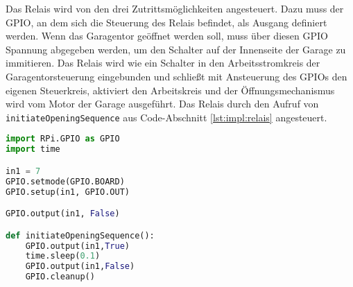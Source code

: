 Das Relais wird von den drei Zutrittsmöglichkeiten angesteuert. Dazu muss der GPIO, an dem sich die Steuerung des Relais befindet, als Ausgang definiert werden. Wenn das Garagentor geöffnet werden soll, muss über diesen GPIO Spannung abgegeben werden, um den Schalter auf der Innenseite der Garage zu immitieren. Das Relais wird wie ein Schalter in den Arbeitsstromkreis der Garagentorsteuerung eingebunden und schließt mit Ansteuerung des GPIOs den eigenen Steuerkreis, aktiviert den Arbeitskreis und der Öffnungsmechanismus wird vom Motor der Garage ausgeführt. Das Relais durch den Aufruf von \verb|initiateOpeningSequence| aus Code-Abschnitt \ref{lst:impl:relais} angesteuert.

\begin{lstlisting}[language=Python, caption=Ansteuerung des Relais, label=lst:impl:relais]
import RPi.GPIO as GPIO
import time

in1 = 7
GPIO.setmode(GPIO.BOARD)
GPIO.setup(in1, GPIO.OUT)

GPIO.output(in1, False)

def initiateOpeningSequence():
    GPIO.output(in1,True)
    time.sleep(0.1)
    GPIO.output(in1,False)
    GPIO.cleanup()
\end{lstlisting}